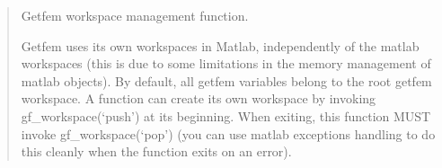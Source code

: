 \documentclass[a4paper,11pt,english]{sphinxmanual}
\begin{document}
\begin{sphinxVerbatim}[commandchars=\\\{\}]
  \PYG{p}{[} \PYG{p}{]}
 \PYG{p}{[}\PYG{p}{]}
 
\end{sphinxVerbatim}

\sphinxAtStartPar
{}
\begin{quote}

\sphinxAtStartPar
Getfem workspace management function.

\sphinxAtStartPar
Getfem uses its own workspaces in Matlab, independently of the
matlab workspaces (this is due to some limitations in the memory
management of matlab objects). By default, all getfem variables
belong to the root getfem workspace. A function can create its own
workspace by invoking gf\_workspace(‘push’) at its beginning. When
exiting, this function MUST invoke gf\_workspace(‘pop’) (you can
use matlab exceptions handling to do this cleanly when the
function exits on an error).
\end{quote}
\end{document}
